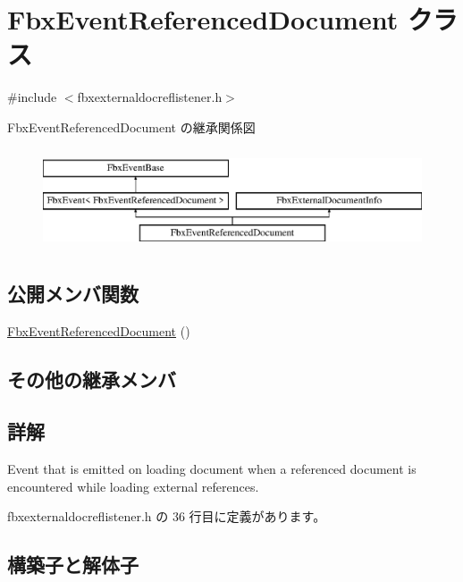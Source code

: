 \hypertarget{class_fbx_event_referenced_document}{}\section{Fbx\+Event\+Referenced\+Document クラス}
\label{class_fbx_event_referenced_document}


{\ttfamily \#include $<$fbxexternaldocreflistener.\+h$>$}

Fbx\+Event\+Referenced\+Document の継承関係図\begin{figure}[H]
\begin{center}
\leavevmode
\includegraphics[height=3.000000cm]{class_fbx_event_referenced_document}
\end{center}
\end{figure}
\subsection*{公開メンバ関数}
\begin{DoxyCompactItemize}
\item 
\hyperlink{class_fbx_event_referenced_document_a573464a1bcb1982f0f83bee571e35d79}{Fbx\+Event\+Referenced\+Document} ()
\end{DoxyCompactItemize}
\subsection*{その他の継承メンバ}


\subsection{詳解}
Event that is emitted on loading document when a referenced document is encountered while loading external references. 

 fbxexternaldocreflistener.\+h の 36 行目に定義があります。



\subsection{構築子と解体子}
\mbox{\label{class_fbx_event_referenced_document_a573464a1bcb1982f0f83bee571e35d79}} 
